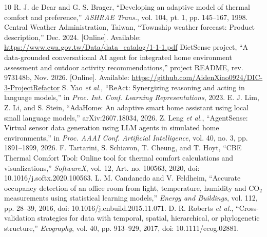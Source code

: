 \documentclass[conference]{IEEEtran}
\begin{document}
\begin{thebibliography}{10}
 R. J. de Dear and G. S. Brager, ``Developing an adaptive model of thermal comfort and preference,'' \emph{ASHRAE Trans.}, vol. 104, pt. 1, pp. 145--167, 1998.
 Central Weather Administration, Taiwan, ``Township weather forecast: Product description,'' Dec. 2024. [Online]. Available: \url{https://www.cwa.gov.tw/Data/data_catalog/1-1-1.pdf}
 DietSense project, ``A data-grounded conversational AI agent for integrated home environment assessment and outdoor activity recommendations,'' project README, rev. 973148b, Nov. 2026. [Online]. Available: \url{https://github.com/AidenXiao0924/DIC-3-ProjectRefactor}
 S. Yao \emph{et al.}, ``ReAct: Synergizing reasoning and acting in language models,'' in \emph{Proc. Int. Conf. Learning Representations}, 2023.
 E. J. Lim, Z. Li, and S. Stein, ``AdaHome: An adaptive smart home assistant using local small language models,'' arXiv:2607.18034, 2026.
 Z. Leng \emph{et al.}, ``AgentSense: Virtual sensor data generation using LLM agents in simulated home environments,'' in \emph{Proc. AAAI Conf. Artificial Intelligence}, vol. 40, no. 3, pp. 1891--1899, 2026.
 F. Tartarini, S. Schiavon, T. Cheung, and T. Hoyt, ``CBE Thermal Comfort Tool: Online tool for thermal comfort calculations and visualizations,'' \emph{SoftwareX}, vol. 12, Art. no. 100563, 2020, doi: 10.1016/j.softx.2020.100563.
 L. M. Candanedo and V. Feldheim, ``Accurate occupancy detection of an office room from light, temperature, humidity and CO$_2$ measurements using statistical learning models,'' \emph{Energy and Buildings}, vol. 112, pp. 28--39, 2016, doi: 10.1016/j.enbuild.2015.11.071.
 D. R. Roberts \emph{et al.}, ``Cross-validation strategies for data with temporal, spatial, hierarchical, or phylogenetic structure,'' \emph{Ecography}, vol. 40, pp. 913--929, 2017, doi: 10.1111/ecog.02881.
\end{thebibliography}
\end{document}
